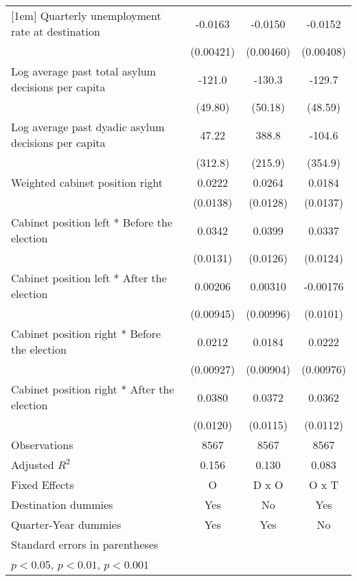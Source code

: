 \begin{table}[htbp]
\begin{tabular}{l*{3}{c}}
[1em]
Quarterly unemployment rate at destination&     -0.0163\sym{***}&     -0.0150\sym{**} &     -0.0152\sym{***}\\
                    &   (0.00421)         &   (0.00460)         &   (0.00408)         \\
[1em]
Log average past total asylum decisions per capita&      -121.0\sym{*}  &      -130.3\sym{*}  &      -129.7\sym{*}  \\
                    &     (49.80)         &     (50.18)         &     (48.59)         \\
[1em]
Log average past dyadic asylum decisions per capita&       47.22         &       388.8         &      -104.6         \\
                    &     (312.8)         &     (215.9)         &     (354.9)         \\
[1em]
Weighted cabinet position right&      0.0222         &      0.0264\sym{*}  &      0.0184         \\
                    &    (0.0138)         &    (0.0128)         &    (0.0137)         \\
[1em]
Cabinet position left * Before the election&      0.0342\sym{*}  &      0.0399\sym{**} &      0.0337\sym{**} \\
                    &    (0.0131)         &    (0.0126)         &    (0.0124)         \\
[1em]
Cabinet position left * After the election&     0.00206         &     0.00310         &    -0.00176         \\
                    &   (0.00945)         &   (0.00996)         &    (0.0101)         \\
[1em]
Cabinet position right * Before the election&      0.0212\sym{*}  &      0.0184\sym{*}  &      0.0222\sym{*}  \\
                    &   (0.00927)         &   (0.00904)         &   (0.00976)         \\
[1em]
Cabinet position right * After the election&      0.0380\sym{**} &      0.0372\sym{**} &      0.0362\sym{**} \\
                    &    (0.0120)         &    (0.0115)         &    (0.0112)         \\
\hline
Observations        &        8567         &        8567         &        8567         \\
Adjusted \(R^{2}\)  &       0.156         &       0.130         &       0.083         \\
Fixed Effects       &           O         &       D x O         &       O x T         \\
Destination dummies &         Yes         &          No         &         Yes         \\
Quarter-Year dummies&         Yes         &         Yes         &          No         \\
\hline\hline
\multicolumn{4}{l}{\footnotesize Standard errors in parentheses}\\
\multicolumn{4}{l}{\footnotesize \sym{*} \(p<0.05\), \sym{**} \(p<0.01\), \sym{***} \(p<0.001\)}\\
\end{tabular}
\end{table}
